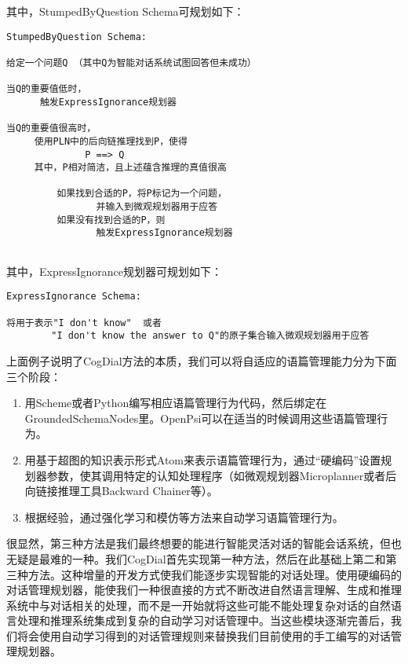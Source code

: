 \noindent 其中，StumpedByQuestion Schema可规划如下：

\begin{verbatim}
StumpedByQuestion Schema:

给定一个问题Q （其中Q为智能对话系统试图回答但未成功）

当Q的重要值低时，
      触发ExpressIgnorance规划器
				
当Q的重要值很高时，
     使用PLN中的后向链推理找到P，使得
              P ==> Q
     其中，P相对简洁，且上述蕴含推理的真值很高

         如果找到合适的P，将P标记为一个问题，
                并输入到微观规划器用于应答
         如果没有找到合适的P，则
                触发ExpressIgnorance规划器
		

\end{verbatim}

\noindent 其中，ExpressIgnorance规划器可规划如下：

\begin{verbatim}
ExpressIgnorance Schema:

将用于表示"I don't know"  或者
        "I don't know the answer to Q"的原子集合输入微观规划器用于应答
\end{verbatim}

上面例子说明了CogDial方法的本质，我们可以将自适应的语篇管理能力分为下面三个阶段：

\begin{enumerate}
\item 用Scheme或者Python编写相应语篇管理行为代码，然后绑定在GroundedSchemaNodes里。OpenPsi可以在适当的时候调用这些语篇管理行为。
\item 用基于超图的知识表示形式Atom来表示语篇管理行为，通过“硬编码”设置规划器参数，使其调用特定的认知处理程序（如微观规划器Microplanner或者后向链接推理工具Backward Chainer等）。
\item 根据经验，通过强化学习和模仿等方法来自动学习语篇管理行为。
\end{enumerate}

\noindent 很显然，第三种方法是我们最终想要的能进行智能灵活对话的智能会话系统，但也无疑是最难的一种。我们CogDial首先实现第一种方法，然后在此基础上第二和第三种方法。这种增量的开发方式使我们能逐步实现智能的对话处理。使用硬编码的对话管理规划器，能使我们一种很直接的方式不断改进自然语言理解、生成和推理系统中与对话相关的处理，而不是一开始就将这些可能不能处理复杂对话的自然语言处理和推理系统集成到复杂的自动学习对话管理中。当这些模块逐渐完善后，我们将会使用自动学习得到的对话管理规则来替换我们目前使用的手工编写的对话管理规划器。

